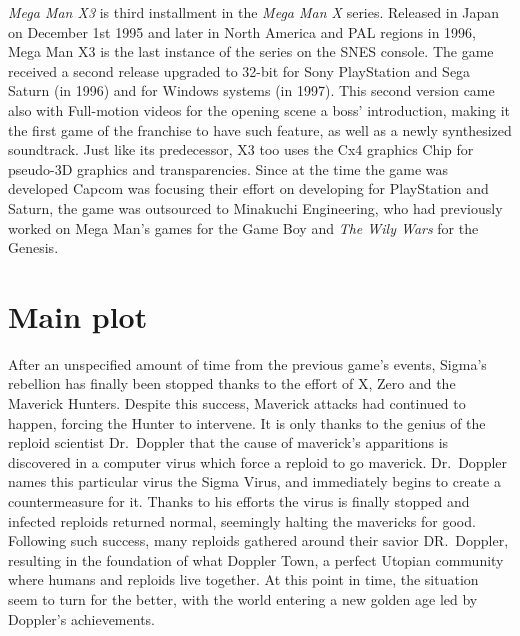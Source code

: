 
\textit{Mega Man X3} is third installment in the \textit{Mega Man X} series. Released in Japan on December 1st 1995 and later in North America and PAL regions in 1996, Mega Man X3 is the last instance of the series on the SNES console. The game received a second release upgraded to 32-bit for Sony PlayStation and Sega Saturn (in 1996) and for Windows systems (in 1997). This second version came also with Full-motion videos for the opening scene a boss' introduction, making it the first game of the franchise to have such feature, as well as a newly synthesized soundtrack. Just like its predecessor, X3 too uses the Cx4 graphics Chip for pseudo-3D graphics and transparencies. Since at the time the game was developed Capcom was focusing their effort on developing for PlayStation and Saturn, the game was outsourced to Minakuchi Engineering, who had previously worked on Mega Man's games for the Game Boy and \textit{The Wily Wars} for the Genesis.

\section{Main plot}
After an unspecified amount of time from the previous game's events, Sigma's rebellion has finally been stopped thanks to the effort of X, Zero and the Maverick Hunters. Despite this success, Maverick attacks had continued to happen, forcing the Hunter to intervene. It is only thanks to the genius of the reploid scientist Dr.~Doppler that the cause of maverick's apparitions is discovered in a computer virus which force a reploid to go maverick. Dr.~Doppler names this particular virus the Sigma Virus, and immediately begins to create a countermeasure for it. Thanks to his efforts the virus is  finally  stopped and infected reploids returned normal, seemingly halting the mavericks for good.  Following such success, many reploids gathered around their savior DR.~Doppler, resulting in the foundation of what Doppler Town, a perfect Utopian community where humans and reploids live together. At this point in time, the situation seem to turn for the better, with the world entering a new golden age led by Doppler's achievements.

